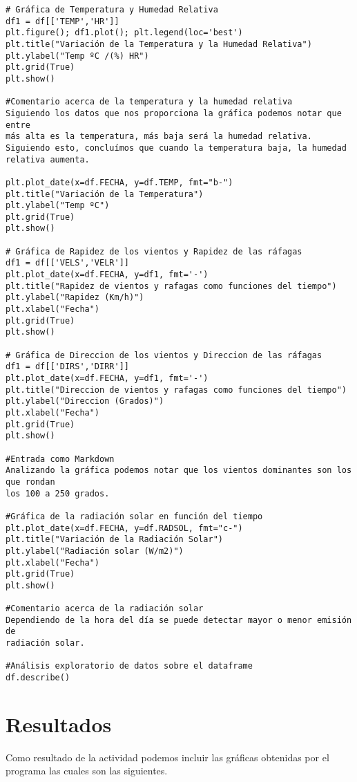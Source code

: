 \documentclass[12pt]{article}
\begin{document}
\begin{verbatim}
# Gráfica de Temperatura y Humedad Relativa
df1 = df[['TEMP','HR']]
plt.figure(); df1.plot(); plt.legend(loc='best')
plt.title("Variación de la Temperatura y la Humedad Relativa")
plt.ylabel("Temp ºC /(%) HR")
plt.grid(True)
plt.show()

#Comentario acerca de la temperatura y la humedad relativa
Siguiendo los datos que nos proporciona la gráfica podemos notar que entre 
más alta es la temperatura, más baja será la humedad relativa. Siguiendo esto, concluímos que cuando la temperatura baja, la humedad relativa aumenta.

plt.plot_date(x=df.FECHA, y=df.TEMP, fmt="b-")
plt.title("Variación de la Temperatura")
plt.ylabel("Temp ºC")
plt.grid(True)
plt.show()

# Gráfica de Rapidez de los vientos y Rapidez de las ráfagas
df1 = df[['VELS','VELR']]
plt.plot_date(x=df.FECHA, y=df1, fmt='-')
plt.title("Rapidez de vientos y rafagas como funciones del tiempo")
plt.ylabel("Rapidez (Km/h)")
plt.xlabel("Fecha")
plt.grid(True)
plt.show()

# Gráfica de Direccion de los vientos y Direccion de las ráfagas
df1 = df[['DIRS','DIRR']]
plt.plot_date(x=df.FECHA, y=df1, fmt='-')
plt.title("Direccion de vientos y rafagas como funciones del tiempo")
plt.ylabel("Direccion (Grados)")
plt.xlabel("Fecha")
plt.grid(True)
plt.show()

#Entrada como Markdown
Analizando la gráfica podemos notar que los vientos dominantes son los que rondan
los 100 a 250 grados.

#Gráfica de la radiación solar en función del tiempo
plt.plot_date(x=df.FECHA, y=df.RADSOL, fmt="c-")
plt.title("Variación de la Radiación Solar")
plt.ylabel("Radiación solar (W/m2)")
plt.xlabel("Fecha")
plt.grid(True)
plt.show()

#Comentario acerca de la radiación solar
Dependiendo de la hora del día se puede detectar mayor o menor emisión de 
radiación solar.

#Análisis exploratorio de datos sobre el dataframe
df.describe()

\end{verbatim}

\section{Resultados}

Como resultado de la actividad podemos incluir las gráficas obtenidas por el programa las cuales son las siguientes.
\end{document}

